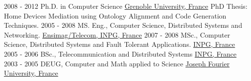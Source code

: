 \documentclass[letterpaper]{twentysecondcv} %
\begin{document}

\begin{twenty} %
	\twentyitem
    	{2008 - 2012}
        {}
        {Ph.D. in Computer Science}
        {\href{https://www.univ-grenoble-alpes.fr/en/}{Grenoble University, France}}
        {PhD Thesis: Home Devices Mediation using Ontology Alignment and Code Generation Techniques.}
        {}
	\twentyitem
    	{2005 - 2008}
		{}
        {MS. Eng., Computer Science, Distributed Systems and Networking.}
        {\href{http://ensimag.grenoble-inp.fr/welcome/}{Ensimag/Telecom, INPG, France}}
        {}
        {}
        \twentyitem
    	{2007 - 2008}
		{}
        {MSc., Computer Science, Distributed Systems and Fault Tolerant Applications.}
        {\href{http://www.grenoble-inp.fr/welcome/}{INPG, France}}
        {}
        {}
         \twentyitem
    	{2005 - 2006}
		{}
        {BSc., Telecommunication and Distributed Systems}
        {\href{http://www.grenoble-inp.fr/welcome/}{INPG, France}}
        {}
        {}
         \twentyitem
    	{2003 - 2005}
		{}
        {DEUG, Computer and Math applied to Science}
        {\href{https://www.univ-grenoble-alpes.fr/en/}{Joseph Fourier University, France}}
        {}
        {}
\end{twenty}

\nextpage
\addtolength{\headheight}{0.5pt}
\end{document}
